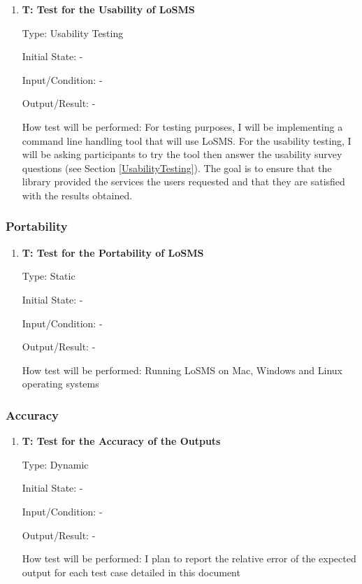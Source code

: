 \documentclass[12pt, titlepage]{article}
\newcounter{testnum} %
\newcommand{\famname}{LoSMS}
\begin{document}
\begin{enumerate}
	\item{\textbf{T\thetestnum \label{Usability}: Test 
	for the Usability of \famname{}}}
	
	Type: Usability Testing
						
	Initial State: -
						
	Input/Condition: -
						
	Output/Result: -
						
	How test will be performed: For testing purposes, I will be implementing a 
	command line handling tool that will use \famname{}. For the usability 
	testing, I will be asking participants to try the tool  then 
	answer the usability survey questions (see Section \ref{UsabilityTesting}). 
	The goal is to ensure that the library provided the services the users 
	requested and that they are satisfied with the results obtained.
\end{enumerate}

\subsubsection{Portability}

\begin{enumerate}
	\item{\textbf{T\thetestnum \label{Portability}: 
	Test for the Portability of \famname{}}}
	
	Type: Static
	
	Initial State: -
	
	Input/Condition: -
	
	Output/Result: -
	
	How test will be performed: Running \famname{} on Mac, Windows and Linux 
	operating systems
\end{enumerate}

\subsubsection{Accuracy}

\begin{enumerate}
	\item{\textbf{T\thetestnum \label{Accuracy}: Test 
	for the Accuracy of the Outputs}}

	Type: Dynamic
	
	Initial State: -
	
	Input/Condition: -
	
	Output/Result: -
	
	How test will be performed: I plan to report the relative error of the 
	expected output for each test case detailed in this document
\end{enumerate}
\end{document}
